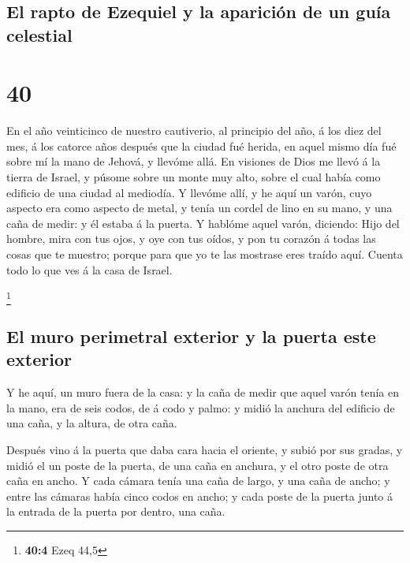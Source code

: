 \hypertarget{el-rapto-de-ezequiel-y-la-apariciuxf3n-de-un-guuxeda-celestial}{%
\subsection{El rapto de Ezequiel y la aparición de un guía
celestial}\label{el-rapto-de-ezequiel-y-la-apariciuxf3n-de-un-guuxeda-celestial}}

\hypertarget{section-39}{%
\section{40}\label{section-39}}

 En el año veinticinco de nuestro cautiverio, al principio
del año, á los diez del mes, á los catorce años después que la ciudad
fué herida, en aquel mismo día fué sobre mí la mano de Jehová, y llevóme
allá.  En visiones de Dios me llevó á la tierra de Israel, y
púsome sobre un monte muy alto, sobre el cual había como edificio de una
ciudad al mediodía.  Y llevóme allí, y he aquí un varón,
cuyo aspecto era como aspecto de metal, y tenía un cordel de lino en su
mano, y una caña de medir: y él estaba á la puerta.  Y
hablóme aquel varón, diciendo: Hijo del hombre, mira con tus ojos, y oye
con tus oídos, y pon tu corazón á todas las cosas que te muestro; porque
para que yo te las mostrase eres traído aquí. Cuenta todo lo que ves á
la casa de Israel.

\footnote{\textbf{40:4} Ezeq 44,5}

\hypertarget{el-muro-perimetral-exterior-y-la-puerta-este-exterior}{%
\subsection{El muro perimetral exterior y la puerta este
exterior}\label{el-muro-perimetral-exterior-y-la-puerta-este-exterior}}

 Y he aquí, un muro fuera de la casa: y la caña de medir que
aquel varón tenía en la mano, era de seis codos, de á codo y palmo: y
midió la anchura del edificio de una caña, y la altura, de otra caña.

 Después vino á la puerta que daba cara hacia el oriente, y
subió por sus gradas, y midió el un poste de la puerta, de una caña en
anchura, y el otro poste de otra caña en ancho.  Y cada
cámara tenía una caña de largo, y una caña de ancho; y entre las cámaras
había cinco codos en ancho; y cada poste de la puerta junto á la entrada
de la puerta por dentro, una caña.

